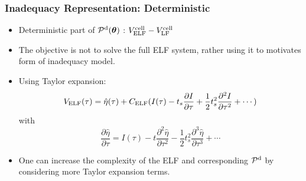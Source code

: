 \documentclass[10pt,xcolor=dvipsnames,compress]{beamer}
\begin{document}
\begin{frame}
\frametitle{Inadequacy Representation: Deterministic}
\vfill

\begin{itemize}
\item Deterministic part of $\mathcal{P}^{\rm d}(\boldsymbol{\theta})$ :
$V^{\rm cell}_{\rm ELF} -  V^{\rm cell}_{\rm LF}$

\item The objective is not to solve the full ELF system, rather using it to motivates form of inadequacy model.

\item Using Taylor expansion:
\begin{equation*}
V_{\rm ELF}(\tau) = \hat{\eta}(\tau) + C_{\rm ELF} (
I(\tau) - t_s \frac{\partial I}{\partial \tau} + \frac{1}{2} t_s^2 \frac{\partial^2 I}{\partial \tau^2} + \cdots
)
\end{equation*}
 with
\begin{equation*}
\frac{\partial{\hat{\eta}}}{\partial\tau} = I(\tau) - t  \frac{\partial^2{\hat{\eta}}}{\partial\tau^2} - \frac{1}{2} t_s^2 \frac{\partial^3{\hat{\eta}}}{\partial\tau^3} + \cdots
\end{equation*}


\item One can increase the complexity of the ELF and corresponding $\mathcal{P}^{\rm d}$ by considering more Taylor expansion terms.

\end{itemize}



\vfill
\end{frame}
\end{document}
